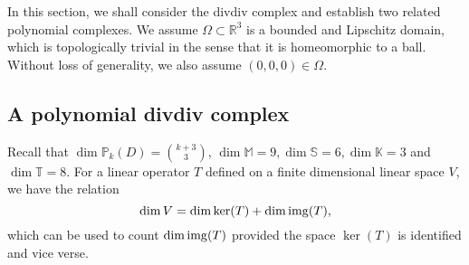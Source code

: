 In this section, we shall consider the divdiv complex and establish two related polynomial complexes. We assume $\Omega \subset \mathbb R^3$ is a bounded and Lipschitz domain, which is topologically trivial in the sense that it is homeomorphic to a ball. Without loss of generality, we also assume $(0,0,0) \in \Omega$. 


\subsection{A polynomial divdiv complex}
Recall that $\dim \mathbb P_{k}(D) = { k + 3 \choose 3}$, $\dim \mathbb M = 9, \dim \mathbb S = 6, \dim \mathbb K = 3$ and $\dim \mathbb T = 8$. For a linear operator $T$ defined on a finite dimensional linear space $V$, we have the relation
\begin{equation*}%
\dim V = \dim \ker(T) + \dim \img(T),
\end{equation*}
which can be used to count $\dim \operatorname*{img}(T)$ provided the space $\ker(T)$ is identified and vice verse. 


